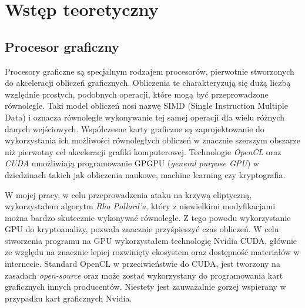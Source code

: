 \section{Wstęp teoretyczny}

\subsection{Procesor graficzny}
Procesory graficzne są specjalnym rodzajem procesorów,
pierwotnie stworzonych do akceleracji obliczeń graficznych.
Obliczenia te charakteryzują się dużą liczbą względnie prostych, podobnych operacji,
które mogą być przeprowadzone równolegle.
Taki model obliczeń nosi nazwę SIMD (Single Instruction Multiple Data)
i oznacza równoległe wykonywanie tej samej operacji dla wielu różnych danych wejściowych.
Współczesne karty graficzne są zaprojektowanie do wykorzystania
ich możliwości równoległych obliczeń w znacznie szerszym obszarze niż
pierwotny cel akceleracji grafiki komputerowej.
Technologie \textit{OpenCL} oraz \textit{CUDA} umożliwiają
programowanie GPGPU (\textit{general purpose GPU}) w
dziedzinach takich jak obliczenia naukowe, machine learning czy kryptografia.

\par
W mojej pracy, w celu przeprowadzenia ataku na krzywą eliptyczną, wykorzystałem
algorytm \textit{Rho Pollard'a}, który z niewielkimi modyfikacjami można bardzo skutecznie wykonywać
równolegle. Z tego powodu wykorzystanie GPU do kryptoanalizy, pozwala znacznie przyśpieszyć czas
obliczeń. W celu stworzenia programu na GPU wykorzystałem technologię Nvidia CUDA, głównie ze względu
na znacznie lepiej rozwinięty ekosystem oraz dostępność materiałów w internecie.
Standard OpenCL w przeciwieństwie do CUDA, jest tworzony na zasadach \textit{open-source} oraz może zostać
wykorzystany do programowania kart graficznych innych producentów. Niestety jest zauważalnie
gorzej wspierany w przypadku kart graficznych Nvidia.
\par

